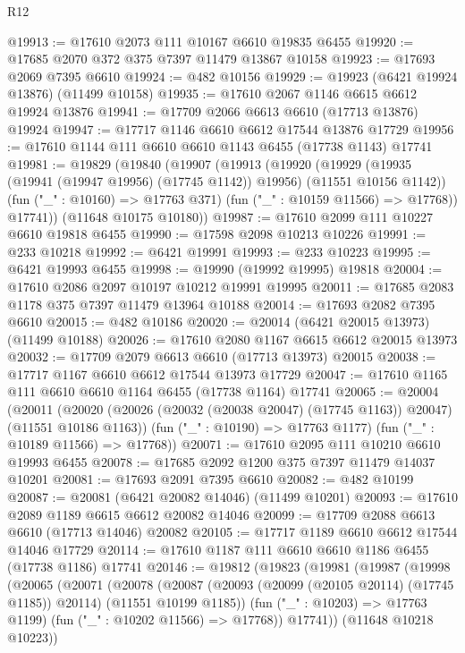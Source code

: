 \begin{lexlean}{R12}
\begin{coremodule}
@19913 := @17610 @2073 @111 @10167 @6610 @19835 @6455
@19920 := @17685 @2070 @372 @375 @7397 @11479 @13867 @10158
@19923 := @17693 @2069 @7395 @6610
@19924 := @482 @10156
@19929 := @19923 (@6421 @19924 @13876) (@11499 @10158)
@19935 := @17610 @2067 @1146 @6615 @6612 @19924 @13876
@19941 := @17709 @2066 @6613 @6610 (@17713 @13876) @19924
@19947 := @17717 @1146 @6610 @6612 @17544 @13876 @17729
@19956 := @17610 @1144 @111 @6610 @6610 @1143 @6455 (@17738 @1143) @17741
@19981 := @19829
    (@19840
      (@19907
        (@19913
          (@19920
            (@19929 (@19935 (@19941 (@19947 @19956) (@17745 @1142)) @19956) (@11551 @10156 @1142))
            (fun ("_" : @10160) => @17763 @371)
            (fun ("_" : @10159 @11566) => @17768))
          @17741))
      (@11648 @10175 @10180))
@19987 := @17610 @2099 @111 @10227 @6610 @19818 @6455
@19990 := @17598 @2098 @10213 @10226
@19991 := @233 @10218
@19992 := @6421 @19991
@19993 := @233 @10223
@19995 := @6421 @19993 @6455
@19998 := @19990 (@19992 @19995) @19818
@20004 := @17610 @2086 @2097 @10197 @10212 @19991 @19995
@20011 := @17685 @2083 @1178 @375 @7397 @11479 @13964 @10188
@20014 := @17693 @2082 @7395 @6610
@20015 := @482 @10186
@20020 := @20014 (@6421 @20015 @13973) (@11499 @10188)
@20026 := @17610 @2080 @1167 @6615 @6612 @20015 @13973
@20032 := @17709 @2079 @6613 @6610 (@17713 @13973) @20015
@20038 := @17717 @1167 @6610 @6612 @17544 @13973 @17729
@20047 := @17610 @1165 @111 @6610 @6610 @1164 @6455 (@17738 @1164) @17741
@20065 := @20004
    (@20011
      (@20020 (@20026 (@20032 (@20038 @20047) (@17745 @1163)) @20047) (@11551 @10186 @1163))
      (fun ("_" : @10190) => @17763 @1177)
      (fun ("_" : @10189 @11566) => @17768))
@20071 := @17610 @2095 @111 @10210 @6610 @19993 @6455
@20078 := @17685 @2092 @1200 @375 @7397 @11479 @14037 @10201
@20081 := @17693 @2091 @7395 @6610
@20082 := @482 @10199
@20087 := @20081 (@6421 @20082 @14046) (@11499 @10201)
@20093 := @17610 @2089 @1189 @6615 @6612 @20082 @14046
@20099 := @17709 @2088 @6613 @6610 (@17713 @14046) @20082
@20105 := @17717 @1189 @6610 @6612 @17544 @14046 @17729
@20114 := @17610 @1187 @111 @6610 @6610 @1186 @6455 (@17738 @1186) @17741
@20146 := @19812
    (@19823
      (@19981
        (@19987
          (@19998
            (@20065
              (@20071
                (@20078
                  (@20087
                    (@20093 (@20099 (@20105 @20114) (@17745 @1185)) @20114)
                    (@11551 @10199 @1185))
                  (fun ("_" : @10203) => @17763 @1199)
                  (fun ("_" : @10202 @11566) => @17768))
                @17741))
            (@11648 @10218 @10223))

\end{coremodule}
\end{lexlean}
